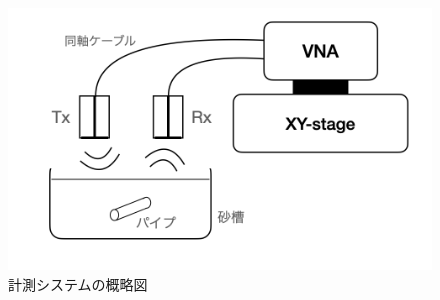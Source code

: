 \documentclass[11pt,a4paper,uplatex]{ujarticle}
\begin{document}
    \begin{figure}[hbtp]
      \centering
      \includegraphics[keepaspectratio, width=130mm]{Images/XYstage_configuration.png}
      \caption{計測システムの概略図}\label{fig:XYstage_configuration}
    \end{figure}
\end{document}
